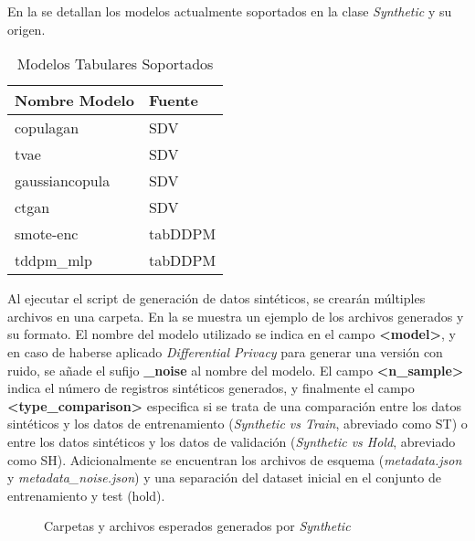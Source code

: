 En la  se detallan los modelos actualmente soportados en la clase \emph{Synthetic} y su origen.

\begin{table}[H]
	\centering
	\caption{Modelos Tabulares Soportados}
	\label{modelos-tab-soportados}
    \begin{tabular}{|l|l|}
        \hline
        \rowcolor[gray]{0.8}
        Nombre Modelo & Fuente \\
        \hline
        copulagan & SDV \cite{kotelnikov_overview_nodate} \\
        \hline
        tvae & SDV \cite{kotelnikov_overview_nodate} \\
        \hline
        gaussiancopula & SDV \cite{kotelnikov_overview_nodate} \\
        \hline
        ctgan & SDV \cite{kotelnikov_overview_nodate} \\
        \hline
        smote-enc & tabDDPM \cite{akim_tabddpm_2023} \\
        \hline
        tddpm\_mlp & tabDDPM \cite{akim_tabddpm_2023} \\
        \hline
      \end{tabular}        
\end{table} 

Al ejecutar el script de generación de datos sintéticos, se crearán múltiples archivos en una carpeta. En la  se muestra un ejemplo de los archivos generados y su formato. El nombre del modelo utilizado se indica en el campo \textbf{<model>}, y en caso de haberse aplicado \emph{Differential Privacy} para generar una versión con ruido, se añade el sufijo \textbf{\_noise} al nombre del modelo. El campo \textbf{<n\_sample>} indica el número de registros sintéticos generados, y finalmente el campo \textbf{<type\_comparison>} especifica si se trata de una comparación entre los datos sintéticos y los datos de entrenamiento (\emph{Synthetic vs Train}, abreviado como ST) o entre los datos sintéticos y los datos de validación (\emph{Synthetic vs Hold}, abreviado como SH). Adicionalmente se encuentran los archivos de esquema (\emph{metadata.json} y \emph{metadata\_noise.json}) y una separación del dataset inicial en el conjunto de entrenamiento y test (hold).
\begin{figure}[H]
	\centering
	
	\caption{Carpetas y archivos esperados generados por \emph{Synthetic}}
	\label{synth-folders}
\end{figure}

